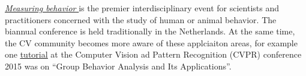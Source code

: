 \href{http://www.measuringbehavior.org/}{\underline{\em Measuring behavior }} is the premier interdisciplinary event for scientists and practitioners concerned with the study of human or animal behavior. The biannual conference is held traditionally in the Netherlands. At the same time, the CV community becomes more aware of these applciaiton areas, for example one \href{http://www.seas.upenn.edu/~hypar/GroupBehavior/cvpr15_tutorial_group_behavior.html}{\underline{tutorial}} at the Computer Vision ad Pattern Recognition (CVPR) conference 2015 was on ``Group Behavior Analysis and Its Applications''.